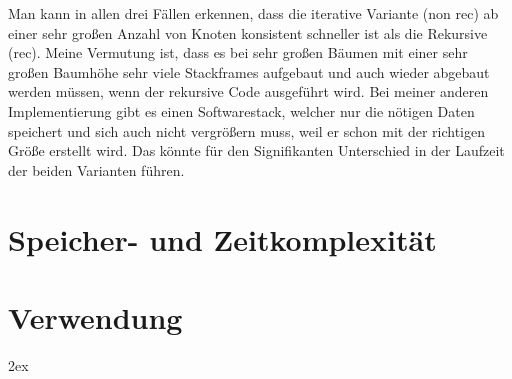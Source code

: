 \documentclass[11pt]{article}
\begin{document}
Man kann in allen drei Fällen erkennen, dass die iterative Variante (non rec) ab einer sehr großen Anzahl von Knoten konsistent schneller ist als die Rekursive (rec).
Meine Vermutung ist, dass es bei sehr großen Bäumen mit einer sehr großen Baumhöhe sehr viele Stackframes aufgebaut und auch wieder abgebaut werden müssen, wenn der rekursive Code ausgeführt wird.
Bei meiner anderen Implementierung gibt es einen Softwarestack, welcher nur die nötigen Daten speichert und sich auch nicht vergrößern muss, weil er schon mit der richtigen Größe erstellt wird.
Das könnte für den Signifikanten Unterschied in der Laufzeit der beiden Varianten führen.

\section{Speicher- und Zeitkomplexität} \label{time}

\section{Verwendung}

\begingroup
\parindent 0pt
\parskip 2ex
\def\enotesize{\normalsize}
\theendnotes
\endgroup


\end{document}
